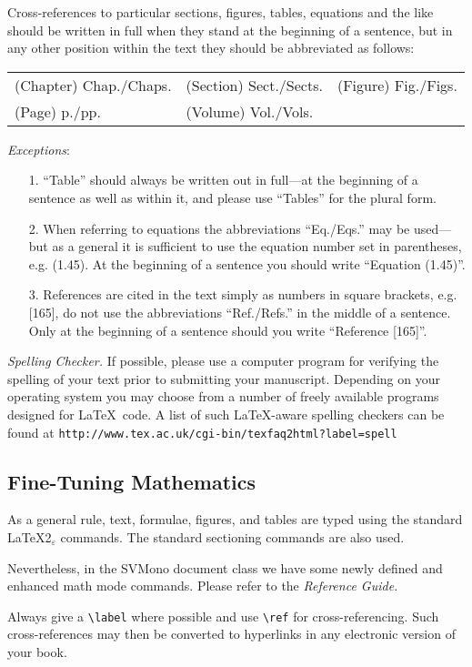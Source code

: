 \documentclass[graybox]{svmono}
\begin{document}
Cross-references to particular sections, figures, tables, equations and the like should be written in full when they stand at the beginning of a sentence, but in any other position within the text they should be abbreviated as follows:

\begin{tabular}{l@{\quad}l@{\quad}l}
(Chapter) Chap./Chaps. & (Section) Sect./Sects. & (Figure) Fig./Figs. \\
(Page) p./pp. & (Volume) Vol./Vols.
\end{tabular}

{\it Exceptions}:
\begin{enumerate}
\item[1.] ``Table'' should always be written out in full---at the beginning of a sentence as well as within it, and please use ``Tables'' for the plural form.
\item[2.] When referring to equations the abbreviations ``Eq./Eqs.'' may be used---but as a general it is sufficient to use the equation number set in parenthe­ses, e.g. (1.45). At the beginning of a sentence you should write ``Equation (1.45)''.
\item[3.] References are cited in the text simply as numbers in square brackets, e.g. [165], do not use the abbreviations ``Ref./Refs.'' in the middle of a sentence. Only at the beginning of a sentence should you write ``Reference [165]''.
\end{enumerate}

{\it Spelling Checker.} If possible, please use a computer program for verifying the spelling of your text prior to submitting your manuscript. Depending on your operating system you may choose from a number of freely available programs designed for \LaTeX~code. A list of such \LaTeX-aware spelling checkers can be found at {\tt http://www.tex.ac.uk/cgi-bin/texfaq2html?label=spell}

\subsection{Fine-Tuning Mathematics}
 As a general rule, text, formulae, figures, and tables are typed using the standard \LaTeX2$_\varepsilon$ commands. The standard sectioning commands are also used.

Nevertheless, in the {\sc SVMono} document class we have some newly defined and enhanced math mode commands. Please refer to the {\it Reference Guide.}

Always give a \verb|\label| where possible and use \verb|\ref| for cross-referencing. Such cross-references may then be converted to hyperlinks in any electronic version of your book.
\end{document}
